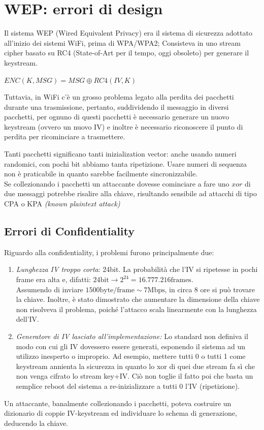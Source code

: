 \section{WEP: errori di design}
Il sistema WEP (Wired Equivalent Privacy) era il sistema di sicurezza adottato all'inizio dei sistemi WiFi, prima di WPA/WPA2; Consisteva in uno stream cipher basato su RC4 (State-of-Art per il tempo, oggi obsoleto) per generare il keystream. 
\begin{center}
    $ENC(K,MSG)=MSG\oplus{RC4(IV,K)}$
\end{center}
Tuttavia, in WiFi c'è un grosso problema legato alla perdita dei pacchetti durante una trasmissione, pertanto, suddividendo il messaggio in diversi pacchetti, per ognuno di questi pacchetti è necessario generare un nuovo keystream (ovvero un nuovo IV) e inoltre è necessario riconoscere il punto di perdita per ricominciare a trasmettere.\\
\begin{remark}
Tanti pacchetti significano tanti inizialization vector: anche usando numeri randomici, con pochi bit abbiamo tanta ripetizione. Usare numeri di sequenza non è praticabile in quanto sarebbe facilmente sincronizzabile.\\
Se collezionando i pacchetti un attaccante dovesse cominciare a fare uno $xor$ di due messaggi potrebbe risalire alla chiave, risultando sensibile ad attacchi di tipo CPA o KPA \textit{(known plaintext attack)}
\end{remark}
\subsection{Errori di Confidentiality}
Riguardo alla confidentiality, i problemi furono principalmente due:
\begin{enumerate}
\item \textit{Lunghezza IV troppo corta}: 24bit. La probabilità che l'IV si ripetesse in pochi frame era alta e, difatti:
$24\text{bit}\rightarrow{2^{24}=16.777.216} \text{frames}$.\\Assumendo di inviare $1500\text{byte/frame}\sim7\text{Mbps}$, in circa 8 ore si può trovare la chiave. Inoltre, è stato dimostrato che aumentare la dimensione della chiave non risolveva il problema, poiché l'attacco scala linearmente con la lunghezza dell'IV.
\item \textit{Generatore di IV lasciato all'implementazione:} Lo standard non definiva il modo con cui gli IV dovessero essere generati, esponendo il sistema ad un utilizzo inesperto o improprio. Ad esempio, mettere tutti 0 o tutti 1 come keystream annienta la sicurezza in quanto lo xor di quei due stream fa sì che non venga cifrato lo stream key+IV. Ciò non toglie il fatto poi che basta un semplice reboot del sistema a re-inizializzare a tutti 0 l’IV (ripetizione).
\end{enumerate}
Un attaccante, banalmente collezionando i pacchetti, poteva costruire un dizionario di coppie IV-keystream ed individuare lo schema di generazione, deducendo la chiave.
